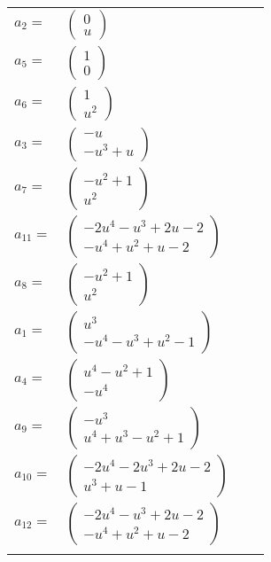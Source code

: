 \documentclass[1p]{elsarticle_modified}
\theoremstyle{definition}
\begin{document}
\begin{tabular}{m{7pt} m{180pt} m{7pt} m{180pt} }
\flushright $a_{2}=$&$\begin{pmatrix}0\\u\end{pmatrix}$ \\
\flushright $a_{5}=$&$\begin{pmatrix}1\\0\end{pmatrix}$ \\
\flushright $a_{6}=$&$\begin{pmatrix}1\\u^2\end{pmatrix}$ \\
\flushright $a_{3}=$&$\begin{pmatrix}- u\\- u^3+u\end{pmatrix}$ \\
\flushright $a_{7}=$&$\begin{pmatrix}- u^2+1\\u^2\end{pmatrix}$ \\
\flushright $a_{11}=$&$\begin{pmatrix}-2 u^4- u^3+2 u-2\\- u^4+u^2+u-2\end{pmatrix}$ \\
\flushright $a_{8}=$&$\begin{pmatrix}- u^2+1\\u^2\end{pmatrix}$ \\
\flushright $a_{1}=$&$\begin{pmatrix}u^3\\- u^4- u^3+u^2-1\end{pmatrix}$ \\
\flushright $a_{4}=$&$\begin{pmatrix}u^4- u^2+1\\- u^4\end{pmatrix}$ \\
\flushright $a_{9}=$&$\begin{pmatrix}- u^3\\u^4+u^3- u^2+1\end{pmatrix}$ \\
\flushright $a_{10}=$&$\begin{pmatrix}-2 u^4-2 u^3+2 u-2\\u^3+u-1\end{pmatrix}$ \\
\flushright $a_{12}=$&$\begin{pmatrix}-2 u^4- u^3+2 u-2\\- u^4+u^2+u-2\end{pmatrix}$\\&\end{tabular}
\end{document}
